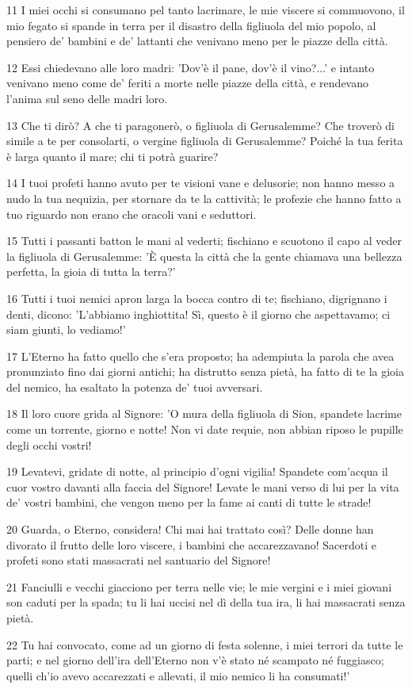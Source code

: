 \par 11 I miei occhi si consumano pel tanto lacrimare, le mie viscere si commuovono, il mio fegato si spande in terra per il disastro della figliuola del mio popolo, al pensiero de' bambini e de' lattanti che venivano meno per le piazze della città.
\par 12 Essi chiedevano alle loro madri: 'Dov'è il pane, dov'è il vino?...' e intanto venivano meno come de' feriti a morte nelle piazze della città, e rendevano l'anima sul seno delle madri loro.
\par 13 Che ti dirò? A che ti paragonerò, o figliuola di Gerusalemme? Che troverò di simile a te per consolarti, o vergine figliuola di Gerusalemme? Poiché la tua ferita è larga quanto il mare; chi ti potrà guarire?
\par 14 I tuoi profeti hanno avuto per te visioni vane e delusorie; non hanno messo a nudo la tua nequizia, per stornare da te la cattività; le profezie che hanno fatto a tuo riguardo non erano che oracoli vani e seduttori.
\par 15 Tutti i passanti batton le mani al vederti; fischiano e scuotono il capo al veder la figliuola di Gerusalemme: 'È questa la città che la gente chiamava una bellezza perfetta, la gioia di tutta la terra?'
\par 16 Tutti i tuoi nemici apron larga la bocca contro di te; fischiano, digrignano i denti, dicono: 'L'abbiamo inghiottita! Sì, questo è il giorno che aspettavamo; ci siam giunti, lo vediamo!'
\par 17 L'Eterno ha fatto quello che s'era proposto; ha adempiuta la parola che avea pronunziato fino dai giorni antichi; ha distrutto senza pietà, ha fatto di te la gioia del nemico, ha esaltato la potenza de' tuoi avversari.
\par 18 Il loro cuore grida al Signore: 'O mura della figliuola di Sion, spandete lacrime come un torrente, giorno e notte! Non vi date requie, non abbian riposo le pupille degli occhi vostri!
\par 19 Levatevi, gridate di notte, al principio d'ogni vigilia! Spandete com'acqua il cuor vostro davanti alla faccia del Signore! Levate le mani verso di lui per la vita de' vostri bambini, che vengon meno per la fame ai canti di tutte le strade!
\par 20 Guarda, o Eterno, considera! Chi mai hai trattato così? Delle donne han divorato il frutto delle loro viscere, i bambini che accarezzavano! Sacerdoti e profeti sono stati massacrati nel santuario del Signore!
\par 21 Fanciulli e vecchi giacciono per terra nelle vie; le mie vergini e i miei giovani son caduti per la spada; tu li hai uccisi nel dì della tua ira, li hai massacrati senza pietà.
\par 22 Tu hai convocato, come ad un giorno di festa solenne, i miei terrori da tutte le parti; e nel giorno dell'ira dell'Eterno non v'è stato né scampato né fuggiasco; quelli ch'io avevo accarezzati e allevati, il mio nemico li ha consumati!'

